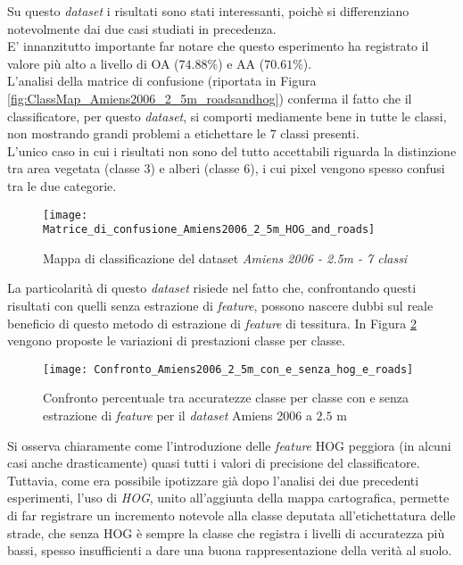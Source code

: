 Su questo \emph{dataset} i risultati sono stati interessanti, poichè si differenziano notevolmente dai due casi studiati in precedenza.\\
E' innanzitutto importante far notare che questo esperimento ha registrato il valore più alto a livello di OA ($74.88\%$) e AA ($70.61\%$). \\
L'analisi della matrice di confusione (riportata in Figura \ref{fig:ClassMap_Amiens2006_2_5m_roadsandhog}) conferma il fatto che il classificatore, per questo \emph{dataset}, si comporti mediamente bene in tutte le classi, non mostrando grandi problemi a etichettare le 7 classi presenti.\\L'unico caso in cui i risultati non sono del tutto accettabili riguarda la distinzione tra area vegetata (classe 3) e alberi (classe 6), i cui pixel vengono spesso confusi tra le due categorie.

\begin{figure}[!ht]
\texttt{[image: Matrice\_di\_confusione\_Amiens2006\_2\_5m\_HOG\_and\_roads]}
\caption{Mappa di classificazione del dataset \emph{Amiens 2006 - 2.5m - 7 classi}}
\label{fig:Matrice_di_confusione_Amiens2006_2_5m_HOG_and_roads}
\end{figure}


La particolarità di questo \emph{dataset} risiede nel fatto che, confrontando questi risultati con quelli senza estrazione di \emph{feature}, possono nascere dubbi sul reale beneficio di questo metodo di estrazione di 
\emph{feature} di tessitura. In Figura \ref{fig:Confronto_Amiens2006_2_5m_con_e_senza_hog_e_roads} vengono proposte le variazioni di prestazioni classe per classe.\\

\begin{figure}[!ht]
\texttt{[image: Confronto\_Amiens2006\_2\_5m\_con\_e\_senza\_hog\_e\_roads]}
\caption{Confronto percentuale tra accuratezze classe per classe con e senza estrazione di \emph{feature} per il \emph{dataset} Amiens 2006 a $2.5$ m}
\label{fig:Confronto_Amiens2006_2_5m_con_e_senza_hog_e_roads}
\end{figure}

Si osserva chiaramente come l'introduzione delle \emph{feature} HOG peggiora (in alcuni casi anche drasticamente) quasi tutti i valori di precisione del classificatore.\\
Tuttavia, come era possibile ipotizzare già dopo l'analisi dei due precedenti esperimenti, l'uso di \emph{HOG}, unito all'aggiunta della mappa cartografica, permette di far registrare un incremento notevole alla classe deputata all'etichettatura delle strade, che senza HOG è sempre la classe che registra i livelli di accuratezza più bassi, spesso insufficienti a dare una buona rappresentazione della verità al suolo. 



